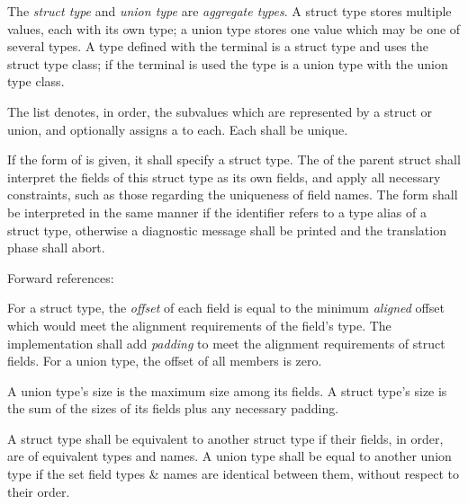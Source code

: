 \specsubsubitem
The \textit{struct type} and \textit{union type} are \textit{aggregate types}.
A struct type stores multiple values, each with its own type; a union type
stores one value which may be one of several types. A type defined with the
 terminal is a struct type and uses the struct type class; if
the  terminal is used the type is a union type with the union
type class.

\specsubsubitem
The  list denotes, in order, the subvalues which are
represented by a struct or union, and optionally assigns a  to
each. Each  shall be unique.

\specsubsubitem
If the  form of  is
given, it shall specify a struct type. The  of the
parent struct shall interpret the fields of this struct type as its own fields,
and apply all necessary constraints, such as those regarding the uniqueness of
field names. The  form shall be interpreted in the same
manner if the identifier refers to a type alias of a struct type, otherwise a
diagnostic message shall be printed and the translation phase shall abort.

Forward references: 


\specsubsubitem
For a struct type, the \textit{offset} of each field is equal to the minimum
\textit{aligned} offset which would meet the alignment requirements of the
field's type. The implementation shall add \textit{padding} to meet the
alignment requirements of struct fields. For a union type, the offset of all
members is zero.

\specsubsubitem
A union type's size is the maximum size among its fields. A struct type's size
is the sum of the sizes of its fields plus any necessary padding.


\specsubsubitem
A struct type shall be equivalent to another struct type if their fields, in
order, are of equivalent types and names. A union type shall be equal to another
union type if the set field types \& names are identical between them,
without respect to their order.


